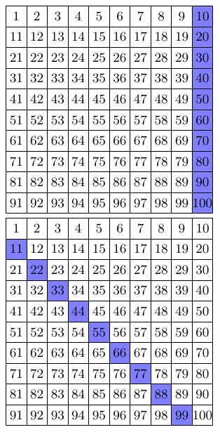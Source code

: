 \documentclass[11pt,a4paper,english]{article}
\begin{document}
\begin{center}
	\includegraphics{10} \qquad \qquad
	\includegraphics{11}
\end{center}
\end{document}
